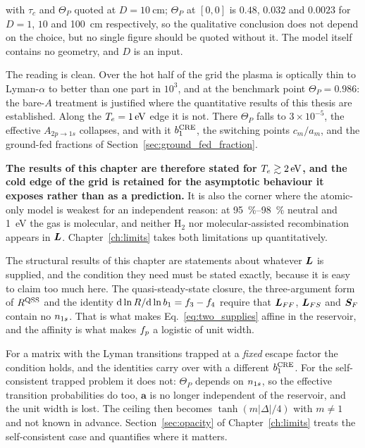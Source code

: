 \noindent with $\tau_c$ and $\Theta_P$ quoted at $D = \SI{10}{\centi\metre}$;
$\Theta_P$ at $[0,0]$ is $0.48$, $0.032$ and $0.0023$ for $D = 1$, $10$ and
\SI{100}{\centi\metre} respectively, so the qualitative conclusion does not
depend on the choice, but no single figure should be quoted without it. The
model itself contains no geometry, and $D$ is an input.

The reading is clean. Over the hot half of the grid the plasma is optically
thin to Lyman-$\alpha$ to better than one part in $10^{3}$, and at the benchmark
point $\Theta_P = 0.986$: the bare-$A$ treatment is justified where the
quantitative results of this thesis are established. Along the
$T_e = \SI{1}{\electronvolt}$ edge it is not. There $\Theta_P$ falls to
$3\times10^{-5}$, the effective $A_{2p\to1s}$ collapses, and with it $b_1^{\rm
CRE}$, the switching points $c_m/a_m$, and the ground-fed fractions of
Section~\ref{sec:ground_fed_fraction}.

\textbf{The results of this chapter are therefore stated for
$T_e \gtrsim \SI{2}{\electronvolt}$, and the cold edge of the grid is retained
for the asymptotic behaviour it exposes rather than as a prediction.} It is also
the corner where the atomic-only model is weakest for an independent reason: at
\SIrange{95}{98}{\percent} neutral and \SI{1}{\electronvolt} the gas is
molecular, and neither $\mathrm{H}_2$ nor molecular-assisted recombination
appears in $\bm{L}$. Chapter~\ref{ch:limits} takes both limitations up
quantitatively.

The structural results of this chapter are statements about whatever $\bm{L}$ is
supplied, and the condition they need must be stated exactly, because it is
easy to claim too much here. The quasi-steady-state closure, the
three-argument form of $R^{\mathrm{QSS}}$ and the identity
$\mathrm{d}\ln R/\mathrm{d}\ln b_1 = f_{3}-f_{4}$ require that
$\bm{L}_{FF}$, $\bm{L}_{FS}$ and $\bm{S}_F$ contain no $n_{1s}$. That is what makes
Eq.~\eqref{eq:two_supplies} affine in the reservoir, and the affinity is what
makes $f_{p}$ a logistic of unit width.

For a matrix with the Lyman transitions trapped at a \emph{fixed} escape factor
the condition holds, and the identities carry over with a different
$b_1^{\rm CRE}$. For the self-consistent trapped problem it does not:
$\Theta_P$ depends on $n_{1s}$, so the effective transition probabilities do too,
$\bm a$ is no longer independent of the reservoir, and the unit width is lost.
The ceiling then becomes $\tanh(m|\Delta|/4)$ with $m \neq 1$ and not known in
advance. Section~\ref{sec:opacity} of Chapter~\ref{ch:limits} treats the
self-consistent case and quantifies where it matters.

